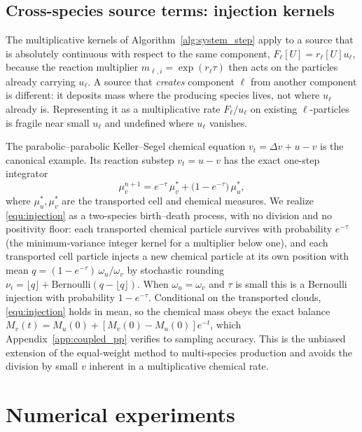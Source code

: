 \documentclass[a4paper,fleqn]{cas-sc}
\theoremstyle{definition}
\theoremstyle{remark}
\begin{document}
\subsection{Cross-species source terms: injection kernels}
\label{sec:injection}

The multiplicative kernels of Algorithm~\ref{alg:system_step} apply to a source that is absolutely continuous with respect to the same component, $F_\ell[U]=r_\ell[U]u_\ell$, because the reaction multiplier $m_{\ell,i}=\exp(r_\ell\tau)$ then acts on the particles already carrying $u_\ell$.  A source that \emph{creates} component $\ell$ from another component is different: it deposits mass where the producing species lives, not where $u_\ell$ already is.  Representing it as a multiplicative rate $F_\ell/u_\ell$ on existing $\ell$-particles is fragile near small $u_\ell$ and undefined where $u_\ell$ vanishes.

The parabolic--parabolic Keller--Segel chemical equation $v_t=\Delta v+u-v$ is the canonical example.  Its reaction substep $v_t=u-v$ has the exact one-step integrator
\begin{equation}
\mu_v^{n+1}=e^{-\tau}\,\mu_v^{*}+\bigl(1-e^{-\tau}\bigr)\,\mu_u^{*},
\label{equ:injection}
\end{equation}
where $\mu_u^{*},\mu_v^{*}$ are the transported cell and chemical measures.  We realize \eqref{equ:injection} as a two-species birth--death process, with no division and no positivity floor: each transported chemical particle survives with probability $e^{-\tau}$ (the minimum-variance integer kernel for a multiplier below one), and each transported cell particle injects a new chemical particle at its own position with mean $q=(1-e^{-\tau})\,\omega_u/\omega_v$ by stochastic rounding $\nu_i=\lfloor q\rfloor+\mathrm{Bernoulli}(q-\lfloor q\rfloor)$.  When $\omega_u=\omega_v$ and $\tau$ is small this is a Bernoulli injection with probability $1-e^{-\tau}$.  Conditional on the transported clouds, \eqref{equ:injection} holds in mean, so the chemical mass obeys the exact balance $M_v(t)=M_u(0)+[M_v(0)-M_u(0)]e^{-t}$, which Appendix~\ref{app:coupled_pp} verifies to sampling accuracy.  This is the unbiased extension of the equal-weight method to multi-species production and avoids the division by small $v$ inherent in a multiplicative chemical rate.

\section{Numerical experiments}
\label{sec:numerics}
\end{document}
